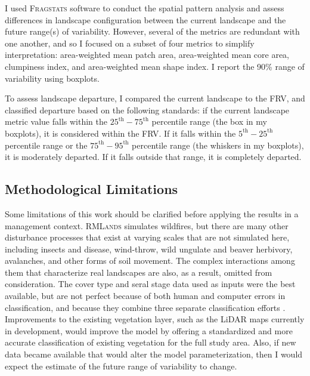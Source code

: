 %
I used \textsc{Fragstats} software \citep{Fragstats2012} to conduct the spatial pattern analysis and assess differences in landscape configuration between the current landscape and the future range(s) of variability. However, several of the metrics are redundant with one another, and so I focused on a subset of four metrics to simplify interpretation: area-weighted mean patch area, area-weighted mean core area, clumpiness index, and area-weighted mean shape index. I report the 90\% range of variability using boxplots. %

To assess landscape departure, I compared the current landscape to the FRV, and classified departure based on the following standards: if the current landscape metric value falls within the $25^{\text{th}}-75^{\text{th}}$ percentile range (the box in my boxplots), it is considered within the FRV. If it falls within the $5^{\text{th}}-25^{\text{th}}$ percentile range or the $75^{\text{th}}-95^{\text{th}}$ percentile range (the whiskers in my boxplots), it is moderately departed. If it falls outside that range, it is completely departed.



\subsection{Methodological Limitations} 
Some limitations of this work should be clarified before applying the results in a management context. \textsc{RMLands} simulates wildfires, but there are many other disturbance processes that exist at varying scales that are not simulated here, including insects and disease, wind-throw, wild ungulate and beaver herbivory, avalanches, and other forms of soil movement. The complex interactions among them that characterize real landscapes are also, as a result, omitted from consideration. %
The cover type and seral stage data used as inputs were the best available, but are not perfect because of both human and computer errors in classification, and because they combine three separate classification efforts \citep{USDAForestService2009}. Improvements to the existing vegetation layer, such as the LiDAR maps currently in development, would improve the model by offering a standardized and more accurate classification of existing vegetation for the full study area. Also, if new data became available that would alter the model parameterization, then I would expect the estimate of the future range of variability to change. 

